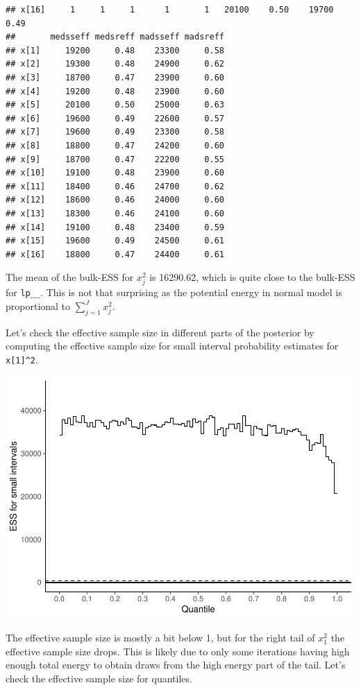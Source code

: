 \documentclass[american,]{article}
\begin{document}
\begin{verbatim}
## x[16]     1     1     1      1       1   20100    0.50    19700     0.49
##       medsseff medsreff madsseff madsreff
## x[1]     19200     0.48    23300     0.58
## x[2]     19300     0.48    24900     0.62
## x[3]     18700     0.47    23900     0.60
## x[4]     19200     0.48    23900     0.60
## x[5]     20100     0.50    25000     0.63
## x[6]     19600     0.49    22600     0.57
## x[7]     19600     0.49    23300     0.58
## x[8]     18800     0.47    24200     0.60
## x[9]     18700     0.47    22200     0.55
## x[10]    19100     0.48    23900     0.60
## x[11]    18400     0.46    24700     0.62
## x[12]    18600     0.46    24000     0.60
## x[13]    18300     0.46    24100     0.60
## x[14]    19100     0.48    23400     0.59
## x[15]    19600     0.49    24500     0.61
## x[16]    18800     0.47    24400     0.61
\end{verbatim}

The mean of the bulk-ESS for \(x_j^2\) is 16290.62, which is quite close
to the bulk-ESS for \texttt{lp\_\_}. This is not that surprising as the
potential energy in normal model is proportional to
\(\sum_{j=1}^J x_j^2\).

Let's check the effective sample size in different parts of the
posterior by computing the effective sample size for small interval
probability estimates for \texttt{x{[}1{]}\^{}2}.

\includegraphics{graphics/local-ess-fit-n-2-1.pdf}

The effective sample size is mostly a bit below 1, but for the right
tail of \(x_1^2\) the effective sample size drops. This is likely due to
only some iterations having high enough total energy to obtain draws
from the high energy part of the tail. Let's check the effective sample
size for quantiles.
\end{document}
